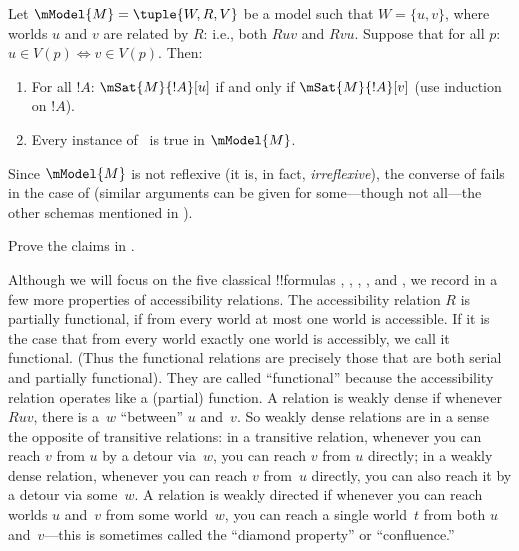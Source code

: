 \documentclass[../../../include/open-logic-section]{subfiles}
\begin{document}
\begin{prop}
  Let $\mModel{M} = \tuple{W, R, V}$ be a model such that $W = \{u, v
  \}$, where worlds $u$ and $v$ are related by $R$: i.e., both $Ruv$
  and $Rvu$.  Suppose that for all $p$: $u \in V(p) \Leftrightarrow v
  \in V(p)$. Then:
  \begin{enumerate}
  \item For all $!A$: $\mSat{M}{!A}[u]$ if and only if
    $\mSat{M}{!A}[v]$ (use induction on $!A$).
  \item Every instance of~ is true in $\mModel{M}$.
  \end{enumerate}
  Since $\mModel{M}$ is not reflexive (it is, in fact,
  \emph{irreflexive}), the converse of 
  fails in the case of  (similar arguments can be given for
  some---though not all---the other schemas mentioned in
  ).
\end{prop}

\begin{prob}
  Prove the claims in .
\end{prob}

Although we will focus on the five classical !!{formula}s ,
, , , and , we record in
 a few more properties of accessibility
relations. The accessibility relation $R$ is partially functional, if
from every world at most one world is accessible. If it is the case
that from every world exactly one world is accessibly, we call it
functional. (Thus the functional relations are precisely those that
are both serial and partially functional). They are called
``functional'' because the accessibility relation operates like a
(partial) function. A relation is weakly dense if whenever $Ruv$,
there is a~$w$ ``between'' $u$ and~$v$. So weakly dense relations are
in a sense the opposite of transitive relations: in a transitive
relation, whenever you can reach $v$ from $u$ by a detour via~$w$, you
can reach $v$ from $u$ directly; in a weakly dense relation, whenever
you can reach $v$ from~$u$ directly, you can also reach it by a detour
via some~$w$. A relation is weakly directed if whenever you can reach
worlds $u$ and~$v$ from some world~$w$, you can reach a single
world~$t$ from both $u$ and~$v$---this is sometimes called the
``diamond property'' or ``confluence.''
\end{document}
